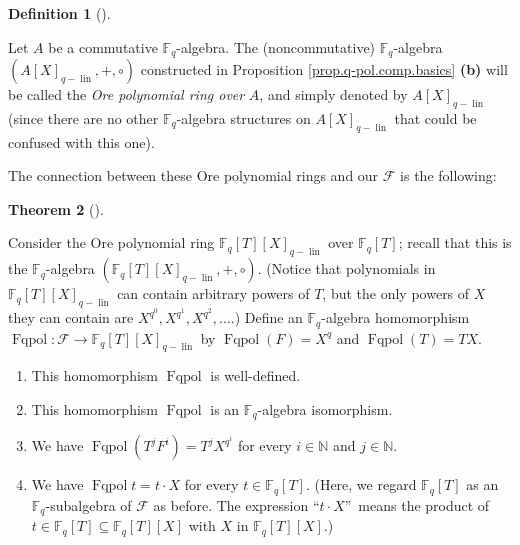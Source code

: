 \documentclass[numbers=enddot,12pt,final,onecolumn,notitlepage]{scrartcl}%
\theoremstyle{definition}
\newtheorem{theo}{Theorem}[section]
\newenvironment{theorem}[1][]
{\begin{theo}[#1]\begin{leftbar}}
{\end{leftbar}\end{theo}}
\newtheorem{defi}[theo]{Definition}
\newenvironment{definition}[1][]
{\begin{defi}[#1]\begin{leftbar}}
{\end{leftbar}\end{defi}}
\begin{document}
\begin{definition}
\label{def.q-pol.ring}Let $A$ be a commutative $\mathbb{F}_{q}$-algebra. The
(noncommutative) $\mathbb{F}_{q}$-algebra $\left(  A\left[  X\right]
_{q-\operatorname*{lin}},+,\circ\right)  $ constructed in Proposition
\ref{prop.q-pol.comp.basics} \textbf{(b)} will be called the \textit{Ore
polynomial ring over }$A$, and simply denoted by $A\left[  X\right]
_{q-\operatorname*{lin}}$ (since there are no other $\mathbb{F}_{q}$-algebra
structures on $A\left[  X\right]  _{q-\operatorname*{lin}}$ that could be
confused with this one).
\end{definition}

The connection between these Ore polynomial rings and our $\mathcal{F}$ is the following:

\begin{theorem}
\label{thm.q-pol.=F}Consider the Ore polynomial ring $\mathbb{F}_{q}\left[
T\right]  \left[  X\right]  _{q-\operatorname*{lin}}$ over $\mathbb{F}%
_{q}\left[  T\right]  $; recall that this is the $\mathbb{F}_{q}$-algebra
$\left(  \mathbb{F}_{q}\left[  T\right]  \left[  X\right]
_{q-\operatorname*{lin}},+,\circ\right)  $. (Notice that polynomials in
$\mathbb{F}_{q}\left[  T\right]  \left[  X\right]  _{q-\operatorname*{lin}}$
can contain arbitrary powers of $T$, but the only powers of $X$ they can
contain are $X^{q^{0}},X^{q^{1}},X^{q^{2}},\ldots$.) Define an $\mathbb{F}%
_{q}$-algebra homomorphism $\operatorname*{Fqpol}:\mathcal{F}\rightarrow
\mathbb{F}_{q}\left[  T\right]  \left[  X\right]  _{q-\operatorname*{lin}}$ by
$\operatorname*{Fqpol}\left(  F\right)  =X^{q}$ and $\operatorname*{Fqpol}%
\left(  T\right)  =TX$.

\begin{enumerate}
\item[\textbf{(a)}] This homomorphism $\operatorname*{Fqpol}$ is well-defined.

\item[\textbf{(b)}] This homomorphism $\operatorname*{Fqpol}$ is an
$\mathbb{F}_{q}$-algebra isomorphism.

\item[\textbf{(c)}] We have $\operatorname*{Fqpol}\left(  T^{j}F^{i}\right)
=T^{j}X^{q^{i}}$ for every $i\in\mathbb{N}$ and $j\in\mathbb{N}$.

\item[\textbf{(d)}] We have $\operatorname*{Fqpol}t=t\cdot X$ for every
$t\in\mathbb{F}_{q}\left[  T\right]  $. (Here, we regard $\mathbb{F}%
_{q}\left[  T\right]  $ as an $\mathbb{F}_{q}$-subalgebra of $\mathcal{F}$ as
before. The expression \textquotedblleft$t\cdot X$\textquotedblright\ means
the product of $t\in\mathbb{F}_{q}\left[  T\right]  \subseteq\mathbb{F}%
_{q}\left[  T\right]  \left[  X\right]  $ with $X$ in $\mathbb{F}_{q}\left[
T\right]  \left[  X\right]  $.)
\end{enumerate}
\end{theorem}
\end{document}
